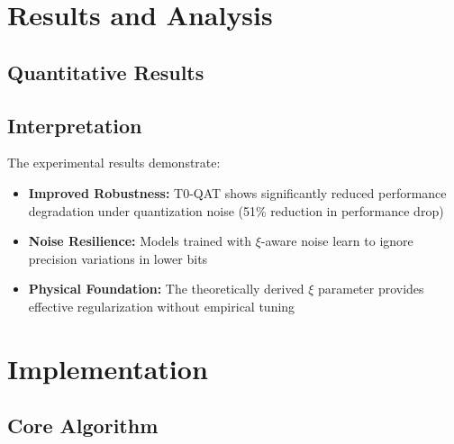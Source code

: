 	\section{Results and Analysis}
	
	\subsection{Quantitative Results}
	
	\begin{table}[h]
		\centering
		\caption{Performance comparison under quantization noise}
		\label{tab:results}
	\end{table}
	
	\subsection{Interpretation}
	
	The experimental results demonstrate:
	
	\begin{itemize}
		\item \textbf{Improved Robustness:} T0-QAT shows significantly reduced performance degradation under quantization noise (51\% reduction in performance drop)
		\item \textbf{Noise Resilience:} Models trained with $\xi$-aware noise learn to ignore precision variations in lower bits
		\item \textbf{Physical Foundation:} The theoretically derived $\xi$ parameter provides effective regularization without empirical tuning
	\end{itemize}
	
	\section{Implementation}
	
	\subsection{Core Algorithm}
	
